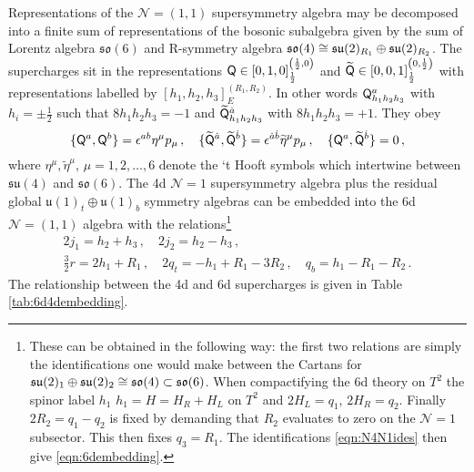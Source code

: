 \documentclass[main.tex]{subfiles}
\begin{document}
Representations of the $\mathcal{N}=(1,1)$ supersymmetry algebra may be decomposed into a finite sum of representations of the bosonic subalgebra given by the sum of Lorentz algebra $\mathfrak{so}(6)$ and R-symmetry algebra $\mathfrak{so}(4)\cong\mathfrak{su}(2)_{R_1}\oplus \mathfrak{su}(2)_{R_2}$. The supercharges sit in the representations $\mathsf{Q}\in[0,1,0]^{\left(\frac{1}{2},0\right)}_{\frac{1}{2}}$ and $\widetilde{\mathsf{Q}}\in[0,0,1]^{\left(0,\frac{1}{2}\right)}_{\frac{1}{2}}$ with representations labelled by $[h_1,h_2,h_3]_E^{(R_1,R_2)}$. In other words $\mathsf{Q}_{h_1h_2h_3}^a$ with $h_i=\pm\frac{1}{2}$ such that $8h_1h_2h_3=-1$ and $\widetilde{\mathsf{Q}}_{h_1h_2h_3}^{\dot a}$ with $8h_1h_2h_3=+1$. They obey
\begin{equation}
\{\mathsf{Q}^a,\mathsf{Q}^b\}=\epsilon^{ab}\eta^{\mu}p_{\mu}\,,\quad\{\widetilde{\mathsf{Q}}^{\dot a},\widetilde{\mathsf{Q}}^{\dot b}\}=\epsilon^{\dot a\dot b}\widetilde{\eta}^{\mu}p_{\mu}\,,\quad\{\mathsf{Q}^{ a},\widetilde{\mathsf{Q}}^{\dot b}\}=0\,,
\end{equation}
where $\eta^{\mu},\widetilde{\eta}^{\mu}$, $\mu=1,2,\dots,6$ denote the `t Hooft symbols which intertwine between $\mathfrak{su}(4)$ and $\mathfrak{so}(6)$. The 4d $\mathcal{N}=1$ supersymmetry algebra plus the residual global  $\mathfrak{u}(1)_t\oplus\mathfrak{u}(1)_b$ symmetry algebras can be embedded into the 6d $\mathcal{N}=(1,1)$ algebra with the relations\footnote{These can be obtained in the following way: the first two relations are simply the identifications one would make between the Cartans for $\mathfrak{su}(2)_1\oplus\mathfrak{su}(2)_2\cong\mathfrak{so}(4)\subset\mathfrak{so}(6)$. When compactifying the 6d theory on $T^2$ the spinor label $h_1$  $h_1=H=H_R+H_L$ on $T^2$ and $2H_L=q_1$, $2H_R=q_2$. Finally $2R_2=q_1-q_2$ is fixed by demanding that $R_2$ evaluates to zero on the $\mathcal{N}=1$ subsector. This then fixes $q_3=R_1$. The identifications \eqref{eqn:N4N1ides} then give \eqref{eqn:6dembedding}.}
\begin{gather}
2j_1=h_2+h_3\,,\quad 2j_2=h_2-h_3\,,\\
\frac{3}{2}r=2h_1+R_1\,,\quad 2q_t=-h_1+R_1-3R_2\,,\quad q_b=h_1-R_1-R_2\label{eqn:6dembedding}\,.
\end{gather}
The relationship between the 4d and 6d supercharges is given in Table \ref{tab:6d4dembedding}.
\end{document}
